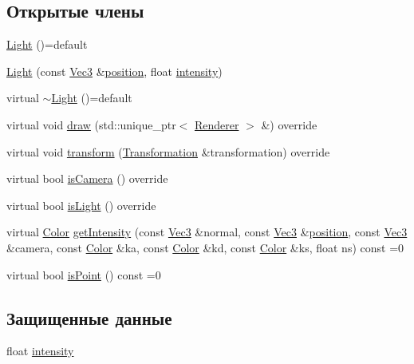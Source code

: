 \subsection*{Открытые члены}
\begin{DoxyCompactItemize}
\item 
\hyperlink{class_light_af49ca6a5dd2fb43fb878a5ad5f0409fe}{Light} ()=default
\item 
\hyperlink{class_light_adc14c27a60cc0b1d86fdc2f44858c705}{Light} (const \hyperlink{vec3_8h_a221ad8ea4d9be4111628ee1ca22ee3ba}{Vec3} \&\hyperlink{class_scene_object_af190cdf9b9449f96f73d836848ce4ad3}{position}, float \hyperlink{class_light_a1071eaa556f4bb2a9345fdfba7e6f220}{intensity})
\item 
virtual \hyperlink{class_light_ae3e3209d4b97d0bbbd614ded5e1213d9}{$\sim$\+Light} ()=default
\item 
virtual void \hyperlink{class_light_a5ae4db3ece8e61f53db06e8d3af4cdca}{draw} (std\+::unique\+\_\+ptr$<$ \hyperlink{class_renderer}{Renderer} $>$ \&) override
\item 
virtual void \hyperlink{class_light_afb03030e1dd8056c73e813095701d796}{transform} (\hyperlink{class_transformation}{Transformation} \&transformation) override
\item 
virtual bool \hyperlink{class_light_a942b4fb690c63be248ae031723a6148c}{is\+Camera} () override
\item 
virtual bool \hyperlink{class_light_af09370083a781d2733247bc2ee2f4c33}{is\+Light} () override
\item 
virtual \hyperlink{class_color}{Color} \hyperlink{class_light_a81a8d20cdba6692644cda765aced1473}{get\+Intensity} (const \hyperlink{vec3_8h_a221ad8ea4d9be4111628ee1ca22ee3ba}{Vec3} \&normal, const \hyperlink{vec3_8h_a221ad8ea4d9be4111628ee1ca22ee3ba}{Vec3} \&\hyperlink{class_scene_object_af190cdf9b9449f96f73d836848ce4ad3}{position}, const \hyperlink{vec3_8h_a221ad8ea4d9be4111628ee1ca22ee3ba}{Vec3} \&camera, const \hyperlink{class_color}{Color} \&ka, const \hyperlink{class_color}{Color} \&kd, const \hyperlink{class_color}{Color} \&ks, float ns) const =0
\item 
virtual bool \hyperlink{class_light_aa17c9733d1616d8631ed63640344b733}{is\+Point} () const =0
\end{DoxyCompactItemize}
\subsection*{Защищенные данные}
\begin{DoxyCompactItemize}
\item 
float \hyperlink{class_light_a1071eaa556f4bb2a9345fdfba7e6f220}{intensity}
\end{DoxyCompactItemize}


